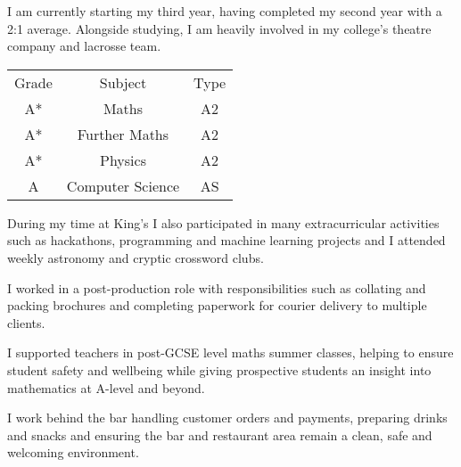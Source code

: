 \documentclass[10pt,a4paper,ragged2e,withhyper]{altacv}
\begin{document}
\begin{paracol}{2}

I am currently starting my third year, having completed my second year with a 2:1 average. Alongside studying, I am heavily involved in my college's theatre company and lacrosse team.

\divider

\begin{center}
\begin{tabular}{ c c c }
\rowcolor{RowDark}
Grade & Subject & Type \\
\rowcolor{RowLight}
A* & Maths & A2 \\
\rowcolor{RowLight}
A* & Further Maths & A2 \\
\rowcolor{RowLight}
A* & Physics & A2 \\
\rowcolor{RowLight}
A & Computer Science & AS
\end{tabular}
\end{center}
\smallskip
During my time at King's I also participated in many extracurricular activities such as hackathons, programming and machine learning projects and I attended weekly astronomy and cryptic crossword clubs.

\medskip


I worked in a post-production role with responsibilities such as collating and packing brochures and completing paperwork for courier delivery to multiple clients.

\divider

I supported teachers in post-GCSE level maths summer classes, helping to ensure student safety and wellbeing while giving prospective students an insight into mathematics at A-level and beyond.

\divider

I work behind the bar handling customer orders and payments, preparing drinks and snacks and ensuring the bar and restaurant area remain a clean, safe and welcoming environment.




\end{paracol}
\end{document}
